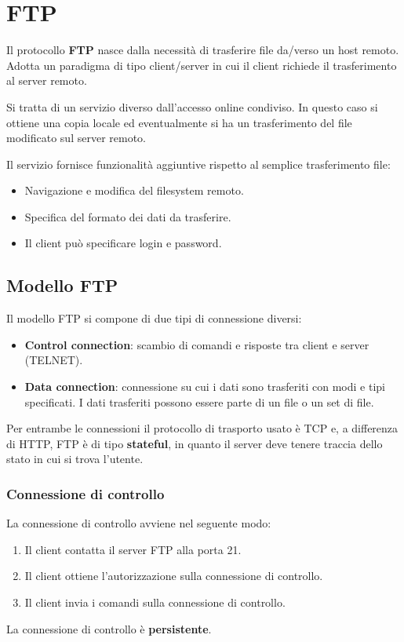 \section{FTP}
Il protocollo \textbf{FTP} nasce dalla necessità di trasferire file 
da/verso un host remoto. Adotta un paradigma di tipo client/server in
cui il client richiede il trasferimento al server remoto.

Si tratta di un servizio diverso dall'accesso online condiviso. In
questo caso si ottiene una copia locale ed eventualmente si ha un
trasferimento del file modificato sul server remoto.

Il servizio fornisce funzionalità aggiuntive rispetto al semplice 
trasferimento file:
\begin{itemize}
	\item Navigazione e modifica del filesystem remoto.
	\item Specifica del formato dei dati da trasferire.
	\item Il client può specificare login e password.
\end{itemize}

\subsection{Modello FTP}
Il modello FTP si compone di due tipi di connessione diversi:
\begin{itemize}
	\item \textbf{Control connection}: scambio di comandi e risposte 
		tra client e server (TELNET).
	\item \textbf{Data connection}: connessione su cui i dati sono 
		trasferiti con modi e tipi specificati. I dati trasferiti 
		possono essere parte di un file o un set di file.
\end{itemize}
Per entrambe le connessioni il protocollo di trasporto usato è TCP e, a
differenza di HTTP, FTP è di tipo \textbf{stateful}, in quanto il 
server deve tenere traccia dello stato in cui si trova l'utente.

\subsubsection{Connessione di controllo}
La connessione di controllo avviene nel seguente modo:
\begin{enumerate}
	\item Il client contatta il server FTP alla porta 21.
	\item Il client ottiene l'autorizzazione sulla connessione di 
		controllo.
	\item Il client invia i comandi sulla connessione di controllo.
\end{enumerate}
La connessione di controllo è \textbf{persistente}.

